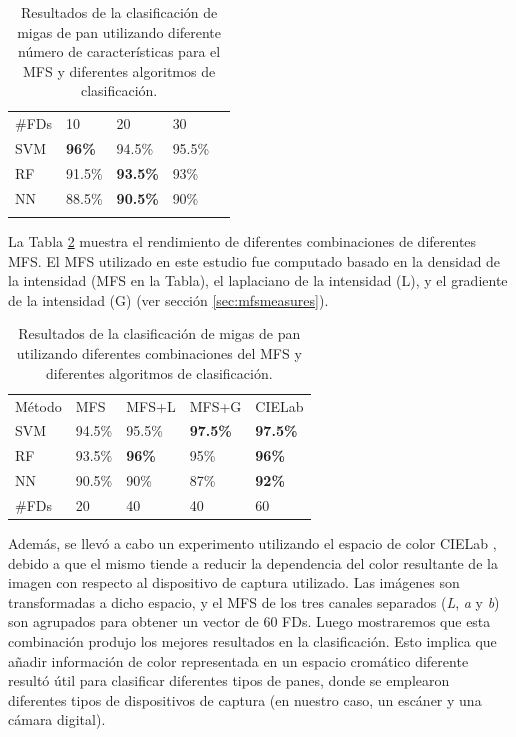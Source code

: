 \begin{table}[h!]
\center
\begin{tabular}{lllll}
\hline\noalign{\smallskip}
\#FDs & 10  & 20 & 30 \\
\noalign{\smallskip}\hline\noalign{\smallskip}
SVM & \textbf{96\%} & 94.5\% & 95.5\% \\
RF  & 91.5\% & \textbf{93.5\%} & 93\% \\
NN & 88.5\% & \textbf{90.5\%} & 90\% \\
\noalign{\smallskip}\hline
\end{tabular}
\caption{Resultados de la clasificación de migas de pan utilizando diferente número de características para el MFS y diferentes algoritmos de clasificación.}
\label{tab:number}       %
\end{table}


La Tabla \ref{tab:mfs} muestra el rendimiento de diferentes combinaciones de diferentes MFS.
El MFS utilizado en este estudio fue computado basado en la densidad de la intensidad (MFS en la Tabla), el laplaciano de la intensidad (L), y el gradiente de la intensidad (G) (ver sección \ref{sec:mfsmeasures}).


\begin{table}[h!]
\center
\begin{tabular}{lllll}
\hline\noalign{\smallskip}
Método & MFS & MFS+L & MFS+G & CIELab  \\
\noalign{\smallskip}\hline\noalign{\smallskip}
SVM & 94.5\% & 95.5\% & \textbf{97.5\%} & \textbf{97.5\%} \\
RF  & 93.5\% & \textbf{96\%} & 95\% & \textbf{96\%} \\
NN & 90.5\% & 90\% & 87\% & \textbf{92\%} \\
\noalign{\smallskip}\hline
\#FDs & 20 & 40 & 40 & 60 \\
\hline
\end{tabular}
\caption{Resultados de la clasificación de migas de pan utilizando diferentes combinaciones del MFS y diferentes algoritmos de clasificación.}
\label{tab:mfs}       %
\end{table}

Además, se llevó a cabo un experimento utilizando el espacio de color CIELab \cite{Hunter58}, debido a que el mismo tiende a reducir la dependencia del color resultante de la imagen con respecto al dispositivo de captura utilizado.
Las imágenes son transformadas a dicho espacio, y el MFS de los tres canales separados ({\em L}, {\em a} y {\em b}) son agrupados para obtener un vector de $60$ FDs.
Luego mostraremos que esta combinación produjo los mejores resultados en la clasificación.
Esto implica que añadir información de color representada en un espacio cromático diferente resultó útil para clasificar diferentes tipos de panes, donde se emplearon diferentes tipos de dispositivos de captura (en nuestro caso, un escáner y una cámara digital).

